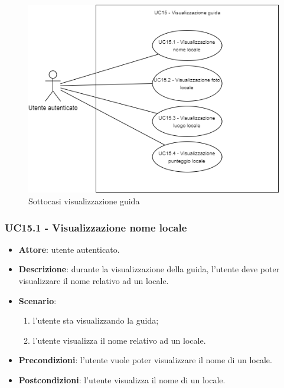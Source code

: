 \begin{figure}[H]
    \includegraphics[width=12cm]{sezioni/Images/UC15_s.png}
    \centering
    \caption{Sottocasi visualizzazione guida}
\end{figure}

\subsubsection{UC15.1 - Visualizzazione nome locale}
\begin{itemize}
    \item \textbf{Attore}: utente autenticato.
    \item \textbf{Descrizione}: durante la visualizzazione della guida, l'utente deve poter visualizzare il nome relativo ad un locale.
    \item \textbf{Scenario}:
    \begin{enumerate}
        \item l'utente sta visualizzando la guida;
        \item l'utente visualizza il nome relativo ad un locale.
    \end{enumerate}
    \item \textbf{Precondizioni}: l'utente vuole poter visualizzare il nome di un locale.
    \item \textbf{Postcondizioni}: l'utente visualizza il nome di un locale.
\end{itemize}

